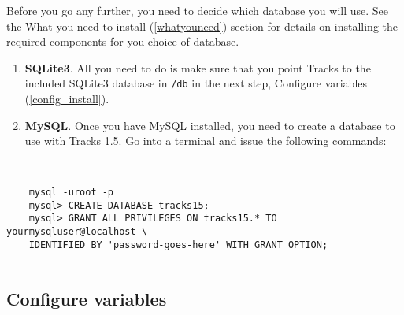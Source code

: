 \documentclass[10pt,twoside]{memoir}
\begin{document}
Before you go any further, you need to decide which database you will use. See the What you need to install (\autoref{whatyouneed}) section for details on installing the required components for you choice of database.


\begin{enumerate}


\item \textbf{SQLite3}. All you need to do is make sure that you point Tracks to the included SQLite3 database in \texttt{/db} in the next step, Configure variables (\autoref{config_install}).

\item \textbf{MySQL}. Once you have MySQL installed, you need to create a database to use with Tracks 1.5. Go into a terminal and issue the following commands:
\end{enumerate}

\begin{adjustwidth}{2.5em}{2.5em}
\begin{verbatim}


    mysql -uroot -p
    mysql> CREATE DATABASE tracks15;
    mysql> GRANT ALL PRIVILEGES ON tracks15.* TO yourmysqluser@localhost \
    IDENTIFIED BY 'password-goes-here' WITH GRANT OPTION;


\end{verbatim}
\end{adjustwidth}

\subsection{Configure variables}
\label{config_install}
\end{document}
